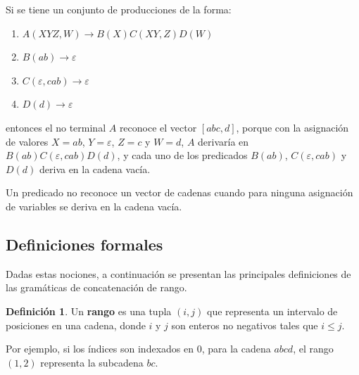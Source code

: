 \documentclass{report}
\theoremstyle{definition}
\newtheorem{definicion}{Definición}[chapter]
\theoremstyle{plain}
\theoremstyle{remark}
\begin{document}
Si se tiene un conjunto de producciones de la forma:
\begin{enumerate}
  \item $A(XYZ, W) \to B(X) C(XY, Z) D(W)$
  \item $B(ab) \to \varepsilon$
  \item $C(\varepsilon, cab) \to \varepsilon$
  \item $D(d) \to \varepsilon$
\end{enumerate}
entonces el no terminal $A$ reconoce el vector $[abc, d]$, porque con la
asignación de valores $X = ab$, $Y = \varepsilon$, $Z = c$ y $W = d$,
$A$ derivaría en $B(ab) C(\varepsilon, cab) D(d)$, y cada uno de los
predicados $B(ab)$, $C(\varepsilon, cab)$ y $D(d)$ deriva en la cadena
vacía.

Un predicado no reconoce un vector de cadenas cuando para ninguna
asignación de variables se deriva en la cadena vacía.

\subsection{Definiciones formales}

Dadas estas nociones, a continuación se presentan las principales
definiciones de las gramáticas de concatenación de rango.

\begin{definicion}
Un \textbf{rango} es una tupla $(i, j)$ que representa un intervalo de
posiciones en una cadena, donde $i$ y $j$ son enteros no negativos tales
que $i \le j$.
\end{definicion}

Por ejemplo, si los índices son indexados en $0$, para la cadena $abcd$,
el rango $(1, 2)$ representa la subcadena $bc$.
\end{document}
